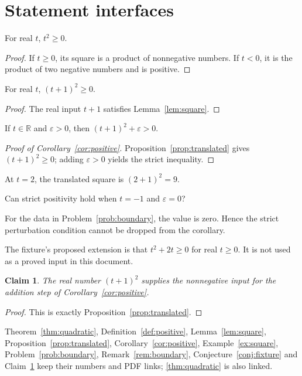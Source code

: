 \documentclass[12pt,reqno]{amsart}
\newtheorem{claim}[theorem]{Claim}
\begin{document}
\section{Statement interfaces}
\begin{lemma}\label{lem:square}
For real $t$, $t^2\geq0$.
\end{lemma}
\begin{proof}
If $t\geq0$, its square is a product of nonnegative numbers. If $t<0$,
it is the product of two negative numbers and is positive.
\end{proof}
\begin{proposition}\label{prop:translated}
For real $t$, $(t+1)^2\geq0$.
\end{proposition}
\begin{proof}
The real input $t+1$ satisfies Lemma~\ref{lem:square}.
\end{proof}
\begin{corollary}\label{cor:positive}
If $t\in\mathbb R$ and $\varepsilon>0$, then $(t+1)^2+\varepsilon>0$.
\end{corollary}
\begin{proof}[Proof of Corollary~\ref{cor:positive}]
Proposition~\ref{prop:translated} gives $(t+1)^2\geq0$; adding
$\varepsilon>0$ yields the strict inequality.
\end{proof}
\begin{example}\label{ex:square}
At $t=2$, the translated square is $(2+1)^2=9$.
\end{example}
\begin{problem}\label{prob:boundary}
Can strict positivity hold when $t=-1$ and $\varepsilon=0$?
\end{problem}
\begin{remark}\label{rem:boundary}
For the data in Problem~\ref{prob:boundary}, the value is zero. Hence the
strict perturbation condition cannot be dropped from the corollary.
\end{remark}
\begin{conjecture}\label{conj:fixture}
The fixture's proposed extension is that $t^2+2t\geq0$ for real $t\geq0$.
It is not used as a proved input in this document.
\end{conjecture}
\begin{claim}\label{claim:interface}
The real number $(t+1)^2$ supplies the nonnegative input for the addition
step of Corollary~\ref{cor:positive}.
\end{claim}
\begin{proof}
This is exactly Proposition~\ref{prop:translated}.
\end{proof}
Theorem~\ref{thm:quadratic}, Definition~\ref{def:positive},
Lemma~\ref{lem:square}, Proposition~\ref{prop:translated},
Corollary~\ref{cor:positive}, Example~\ref{ex:square},
Problem~\ref{prob:boundary}, Remark~\ref{rem:boundary},
Conjecture~\ref{conj:fixture} and Claim~\ref{claim:interface} keep their
numbers and PDF links; \autoref{thm:quadratic} is also linked.
\end{document}
